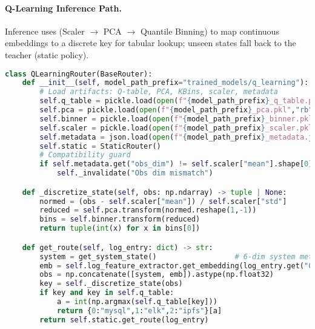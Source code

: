 \paragraph{Q-Learning Inference Path.}
Inference uses (Scaler $\rightarrow$ PCA $\rightarrow$ Quantile Binning) to map continuous embeddings to a discrete key for tabular lookup; unseen states fall back to the teacher (static policy).
\begin{lstlisting}[language=Python,caption={Tabular Q-Learning router state discretization},label={lst:qrouter}]
class QLearningRouter(BaseRouter):
    def __init__(self, model_path_prefix="trained_models/q_learning"):
        # Load artifacts: Q-table, PCA, KBins, scaler, metadata
        self.q_table = pickle.load(open(f"{model_path_prefix}_q_table.pkl","rb"))
        self.pca = pickle.load(open(f"{model_path_prefix}_pca.pkl","rb"))
        self.binner = pickle.load(open(f"{model_path_prefix}_binner.pkl","rb"))
        self.scaler = pickle.load(open(f"{model_path_prefix}_scaler.pkl","rb"))
        self.metadata = json.load(open(f"{model_path_prefix}_metadata.json"))
        self.static = StaticRouter()
        # Compatibility guard
        if self.metadata.get("obs_dim") != self.scaler["mean"].shape[0]:
            self._invalidate("Obs dim mismatch")

    def _discretize_state(self, obs: np.ndarray) -> tuple | None:
        normed = (obs - self.scaler["mean"]) / self.scaler["std"]
        reduced = self.pca.transform(normed.reshape(1,-1))
        bins = self.binner.transform(reduced)
        return tuple(int(x) for x in bins[0])

    def get_route(self, log_entry: dict) -> str:
        system = get_system_state()                  # 6-dim system metrics
        emb = self.log_feature_extractor.get_embedding(log_entry.get("Content",""))
        obs = np.concatenate([system, emb]).astype(np.float32)
        key = self._discretize_state(obs)
        if key and key in self.q_table:
            a = int(np.argmax(self.q_table[key]))
            return {0:"mysql",1:"elk",2:"ipfs"}[a]
        return self.static.get_route(log_entry)
\end{lstlisting}

